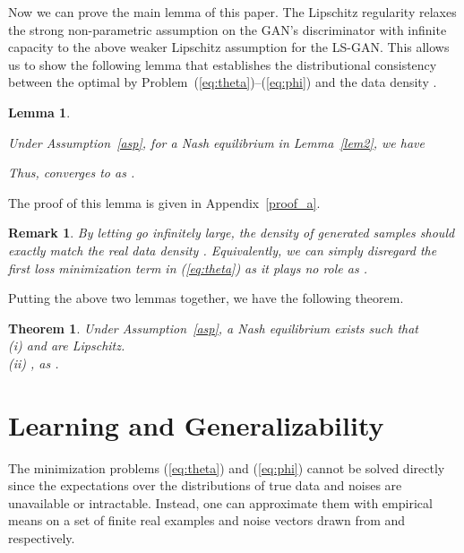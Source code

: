 \documentclass[11pt,fullpage, letterpaper,twoside]{article}
\newtheorem{theorem}{Theorem}
\newtheorem{lemma}{Lemma}
\newtheorem{remark}{Remark}
\newcommand{\1}[1]{\mathds{1}_{\left[#1\right]}}
\begin{document}
Now we can prove the main lemma of this paper. The Lipschitz regularity relaxes the strong non-parametric assumption on the GAN's discriminator with infinite capacity to the above weaker Lipschitz assumption for the LS-GAN. This allows us to show the following lemma that establishes the distributional consistency between the optimal  by Problem~(\ref{eq:theta})--(\ref{eq:phi}) and the data density .











\begin{lemma}\label{lem1}
{Under Assumption~\ref{asp}, for a Nash equilibrium  in Lemma~\ref{lem2}, we have

Thus,  converges to  as .}
\end{lemma}
The proof of this lemma is given in Appendix~\ref{proof_a}.
\begin{remark}
By letting  go infinitely large, the density  of generated samples should exactly match the real data density .  Equivalently, we can simply disregard the first loss minimization term in (\ref{eq:theta}) as it plays no role as .
\end{remark}






Putting the above two lemmas together, we have the following theorem.
\begin{theorem}\label{thm3}
Under Assumption~\ref{asp}, a Nash equilibrium  exists such that\\
(i)  and  are Lipschitz.\\
(ii) , as .\\
\end{theorem}















\section{Learning and Generalizability}\label{sec:alg}
The minimization problems (\ref{eq:theta}) and (\ref{eq:phi}) cannot be solved directly since the expectations over the distributions of true data  and noises  are unavailable or intractable.  Instead, one can approximate them with empirical means on a set of finite real examples  and noise vectors  drawn from  and  respectively.
\end{document}
